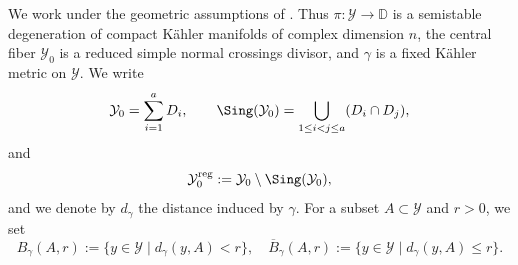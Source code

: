 \documentclass[12pt]{amsart}
\begin{document}
We work under the geometric assumptions of . Thus
\(\pi \colon \mathcal{Y} \to \mathbb{D}\) is a semistable degeneration of compact K\"ahler manifolds of
complex dimension \(n\), the central fiber \(\mathcal{Y}_{0}\) is a reduced simple normal crossings divisor,
and \(\gamma\) is a fixed K\"ahler metric on \(\mathcal{Y}\). We write
\[
\mathcal{Y}_{0} = \sum_{i=1}^{a} D_{i},
\qquad
\Sing(\mathcal{Y}_{0}) = \bigcup_{1 \le i < j \le a} (D_{i} \cap D_{j}),
\]
and
\[
\mathcal{Y}_{0}^{\mathrm{reg}} := \mathcal{Y}_{0} \setminus \Sing(\mathcal{Y}_{0}),
\]
and we denote by \(d_{\gamma}\) the distance induced by \(\gamma\). For a subset \(A \subset \mathcal{Y}\) and
\(r > 0\), we set
\[
B_{\gamma}(A,r) := \{ y \in \mathcal{Y} \mid d_{\gamma}(y,A) < r \},
\quad
\overline{B}_{\gamma}(A,r) := \{ y \in \mathcal{Y} \mid d_{\gamma}(y,A) \leq r \}
.
\]
\end{document}
